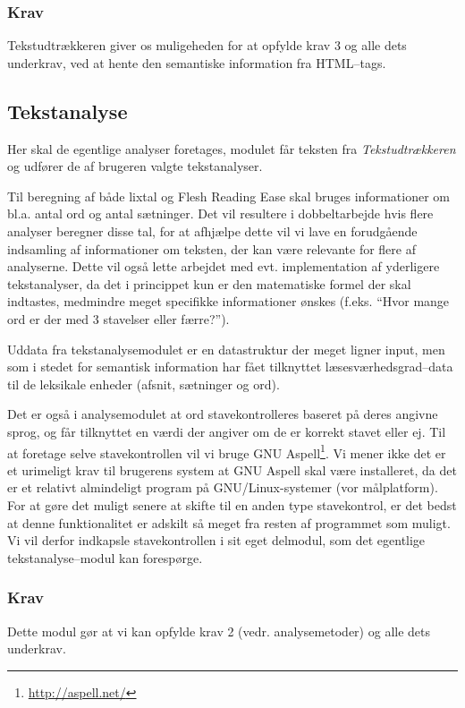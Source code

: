 \documentclass[a4paper,oneside]{memoir}
\begin{document}
\subsubsection{Krav}
Tekstudtrækkeren giver os muligeheden for at opfylde krav 3 og alle
dets underkrav, ved at hente den semantiske information fra
HTML--tags.

\subsection{Tekstanalyse}
\label{tekstanalysedesign}
Her skal de egentlige analyser foretages, modulet får teksten fra
\textit{Tekstudtrækkeren} og udfører de af brugeren valgte
tekstanalyser.

Til beregning af både lixtal og Flesh Reading Ease skal bruges
informationer om bl.a. antal ord og antal sætninger. Det vil resultere
i dobbeltarbejde hvis flere analyser beregner disse tal, for at
afhjælpe dette vil vi lave en forudgående indsamling af informationer
om teksten, der kan være relevante for flere af analyserne. Dette vil
også lette arbejdet med evt. implementation af yderligere
tekstanalyser, da det i princippet kun er den matematiske formel der
skal indtastes, medmindre meget specifikke informationer ønskes
(f.eks. ``Hvor mange ord er der med 3 stavelser eller færre?'').

Uddata fra tekstanalysemodulet er en datastruktur der meget ligner
input, men som i stedet for semantisk information har fået tilknyttet
læsesværhedsgrad--data til de leksikale enheder (afsnit, sætninger og
ord).

Det er også i analysemodulet at ord stavekontrolleres baseret på deres
angivne sprog, og får tilknyttet en værdi der angiver om de er korrekt
stavet eller ej. Til at foretage selve stavekontrollen vil vi bruge
GNU Aspell\footnote{\url{http://aspell.net/}}. Vi mener ikke det er et
urimeligt krav til brugerens system at GNU Aspell skal være
installeret, da det er et relativt almindeligt program på
GNU/Linux-systemer (vor målplatform). For at gøre det muligt senere at
skifte til en anden type stavekontrol, er det bedst at denne
funktionalitet er adskilt så meget fra resten af programmet som
muligt. Vi vil derfor indkapsle stavekontrollen i sit eget delmodul,
som det egentlige tekstanalyse--modul kan forespørge.

\subsubsection{Krav}
Dette modul gør at vi kan opfylde krav 2 (vedr. analysemetoder) og
alle dets underkrav.
\end{document}
